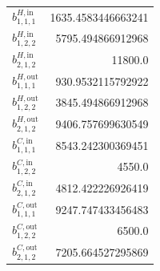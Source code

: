 \documentclass{article}%
\begin{document}
\begin{multicols*}{3}
\begin{supertabular}{lr}
	$b_{1,1,1}^{H,\text{in}}$ & 1635.4583446663241 \\%
	$b_{1,2,2}^{H,\text{in}}$ & 5795.494866912968 \\%
	$b_{2,1,2}^{H,\text{in}}$ & 11800.0 \\%
	$b_{1,1,1}^{H,\text{out}}$ & 930.9532115792922 \\%
	$b_{1,2,2}^{H,\text{out}}$ & 3845.494866912968 \\%
	$b_{2,1,2}^{H,\text{out}}$ & 9406.757699630549 \\%
	$b_{1,1,1}^{C,\text{in}}$ & 8543.242300369451 \\%
	$b_{1,2,2}^{C,\text{in}}$ & 4550.0 \\%
	$b_{2,1,2}^{C,\text{in}}$ & 4812.422226926419 \\%
	$b_{1,1,1}^{C,\text{out}}$ & 9247.747433456483 \\%
	$b_{1,2,2}^{C,\text{out}}$ & 6500.0 \\%
	$b_{2,1,2}^{C,\text{out}}$ & 7205.664527295869 \\%
\end{supertabular}%
\end{multicols*}%
\clearpage%
\end{document}

